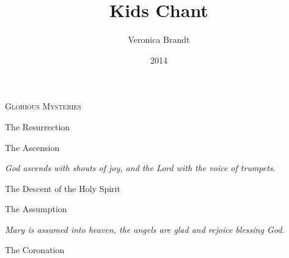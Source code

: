 \documentclass[a5paper, 12pt]{memoir}
\title{Kids Chant}
\author{Veronica Brandt}
\date{2014}
\renewcommand\Rbar{\makebox[1em][l]{\versicles r}}
\let\oldtextbf\textbf
\begin{document}
\setlength{\parindent}{0mm}

\pagestyle{kidschant}

\setcounter{secnumdepth}{0}

\renewcommand\textbf[1]{%
    \pdfliteral direct {2 Tr 0.2 w}%
     \oldtextbf{#1}%
    \pdfliteral direct {0 Tr 0 w}%
}
\newcommand\embolden[1]{%
    \pdfliteral direct {2 Tr 0.2 w}%
     #1%
    \pdfliteral direct {0 Tr 0 w}%
}
\renewcommand\greboldfont[1]{%
    \pdfliteral direct {2 Tr 0.2 w}%
    \oldtextbf{#1}%
    \pdfliteral direct {0 Tr 0 w}%
}

\begin{center}
\textsc{Glorious Mysteries}
\end{center}

The Resurrection


\bigskip

The Ascension




\bigskip

\emph{God ascends with shouts of joy, and the Lord with the voice of trumpets.}

\bigskip

The Descent of the Holy Spirit


\bigskip

The Assumption


\emph{Mary is assumed into heaven, the angels are glad and rejoice blessing God.}

\bigskip

The Coronation
\end{document}
